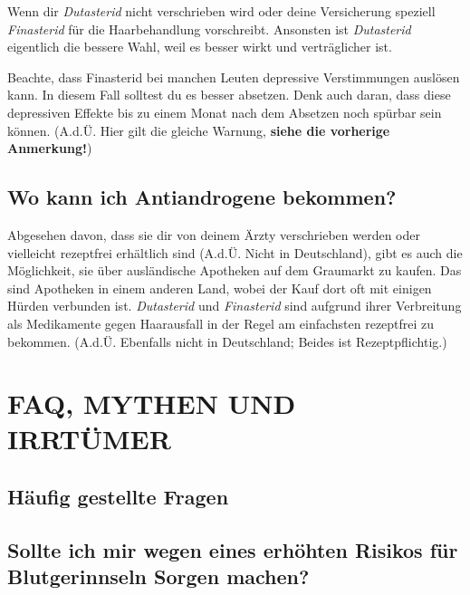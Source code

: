 \documentclass{article}
\begin{document}
Wenn dir \textit{Dutasterid} nicht verschrieben wird oder deine Versicherung speziell \textit{Finasterid} für die Haarbehandlung vorschreibt. Ansonsten ist \textit{Dutasterid} eigentlich die bessere Wahl, weil es besser wirkt und verträglicher ist.

Beachte, dass Finasterid bei manchen Leuten depressive Verstimmungen auslösen kann. In diesem Fall solltest du es besser absetzen. Denk auch daran, dass diese depressiven Effekte bis zu einem Monat nach dem Absetzen noch spürbar sein können. (A.d.Ü. Hier gilt die gleiche Warnung, \textbf{siehe die vorherige Anmerkung!})

																																																																																 

\subsection{Wo kann ich Antiandrogene bekommen?}

Abgesehen davon, dass sie dir von deinem Ärzty verschrieben werden oder vielleicht rezeptfrei erhältlich sind (A.d.Ü. Nicht in Deutschland), gibt es auch die Möglichkeit, sie über ausländische Apotheken auf dem Graumarkt zu kaufen. Das sind Apotheken in einem anderen Land, wobei der Kauf dort oft mit einigen Hürden verbunden ist. \textit{Dutasterid} und \textit{Finasterid} sind aufgrund ihrer Verbreitung als Medikamente gegen Haarausfall in der Regel am einfachsten rezeptfrei zu bekommen. (A.d.Ü. Ebenfalls nicht in Deutschland; Beides ist Rezeptpflichtig.)

 

\section{FAQ, MYTHEN UND IRRTÜMER}\label{MM}

\subsection*{Häufig gestellte Fragen}

\subsection{Sollte ich mir wegen eines erhöhten Risikos für Blutgerinnseln Sorgen machen?}\label{11-1}
\end{document}
